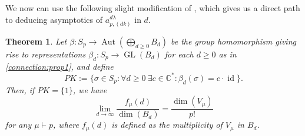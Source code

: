 \documentclass[a4paper]{amsart}
\newtheorem{theorem}{Theorem}
\def\C{{\mathbb{C}}}
\DeclareMathOperator{\GL}{\mathrm{GL}}
\DeclareMathOperator{\Aut}{\mathrm{Aut}}
\DeclareMathOperator{\id}{\mathrm{id}}
\begin{document}
We now can use the following slight modification of \cite{How89}, which gives us a direct path to deducing asymptotics of $a_{p,(dk)}^{d\lambda}$ in $d$.
\begin{theorem}\label{connection:Howe}
	Let $\beta:S_p\to\Aut(\bigoplus_{d\geq0}B_d)$ be the group homomorphism giving rise to representations $\beta_d:S_p\to\GL(B_d)$ for each $d\geq 0$ as in \cref{connection:prop1}, and define
	\begin{displaymath}
		PK:=\{\sigma\in S_p:\forall d\geq0\ \exists c\in\C^*:\beta_d(\sigma)=c\cdot \id\}.
	\end{displaymath}
	Then, if $PK=\{1\}$, we have
	\begin{displaymath}
		\lim\limits_{d\to\infty}\frac{f_\mu(d)}{\dim(B_d)}=\frac{\dim(V_\mu)}{p!}
	\end{displaymath}
	 for any $\mu\vdash p$, where $f_\mu(d)$ is defined as the multiplicity of $V_\mu$ in $B_d$.
\end{theorem}
\end{document}
